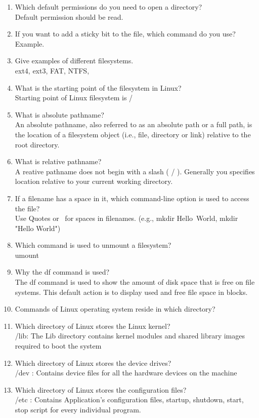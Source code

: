 \documentclass[12pt,a4]{article}
\begin{document}
\begin{enumerate}
	\item Which default permissions do you need to open a directory?\\
	Default permission should be read.
	\item If you want to add a sticky bit to the file, which command do you use? Example.
	\item Give examples of different filesystems.\\
ext4, ext3, FAT, NTFS,
	\item What is the starting point of the filesystem in Linux?\\
	Starting point of Linux filesystem is /
	\item What is absolute pathname?
	\\An absolute pathname, also referred to as an absolute path or a full path, is the location of a filesystem object (i.e., file, directory or link) relative to the root directory. 
	\item What is relative pathname?\\A reative pathname does not begin with a slash ( / ). Generally you specifies location relative to your current working directory. 
	\item If a filename has a space in it, which command-line option is used to access the file?\\
	Use Quotes or \ for spaces in filenames. (e.g., mkdir Hello\ World, mkdir "Hello World")
	\item Which command is used to unmount a filesystem?\\
	umount
	\item Why the df command is used?\\
	The df command is used to show the amount of disk space that is free on file systems.  This default action is to display used and free file space in blocks.
	\item Commands of Linux operating system reside in which directory?
	\item Which directory of Linux stores the Linux kernel?
	\\/lib: The Lib directory contains kernel modules and shared library images required to boot the system 
\item  Which directory of Linux stores the device drives?
\\/dev : Contains device files for all the hardware devices on the machine
\item  Which directory of Linux stores the configuration files?\\
/etc : Contains Application’s configuration files, startup, shutdown, start, stop script for every individual program.

\end{enumerate}
\end{document}
